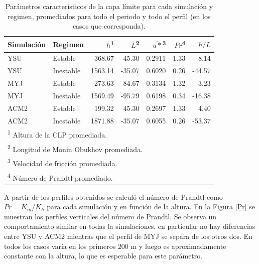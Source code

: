\documentclass[12pt,spanish,oneside, a4paper]{book}
\begin{document}
\begin{table}[!h]

\caption{\label{tab:tabla-clp}Parámetros característicos de la capa límite para cada simulación y regimen, promediados para todo el periodo y todo el perfil (en los casos que corresponda). \label{tabla-clp}}
\centering
\begin{tabular}[t]{llrrrrr}
\toprule
Simulación & Regimen & $\overline{h}$\textsuperscript{1} & $\overline{L}$\textsuperscript{2} & $\overline{u*}$\textsuperscript{3} & $\overline{Pr}$\textsuperscript{4} & $h/L$\\
\midrule
YSU & Estable & 368.67 & 45.30 & 0.2911 & 1.33 & 8.14\\
YSU & Inestable & 1563.14 & -35.07 & 0.6020 & 0.26 & -44.57\\
MYJ & Estable & 273.63 & 84.67 & 0.3134 & 1.32 & 3.23\\
MYJ & Inestable & 1569.49 & -95.79 & 0.6198 & 0.34 & -16.38\\
ACM2 & Estable & 199.32 & 45.30 & 0.2697 & 1.33 & 4.40\\
ACM2 & Inestable & 1871.88 & -35.07 & 0.6055 & 0.26 & -53.37\\
\bottomrule
\multicolumn{7}{l}{\textsuperscript{1} Altura de la CLP promediada.}\\
\multicolumn{7}{l}{\textsuperscript{2} Longitud de Monin Obukhov promediada.}\\
\multicolumn{7}{l}{\textsuperscript{3} Velocidad de fricción promediada.}\\
\multicolumn{7}{l}{\textsuperscript{4} Número de Prandtl promediado.}\\
\end{tabular}
\end{table}

A partir de los perfiles obtenidos se calculó el número de Prandtl como
\(Pr = K_m/K_h\) para cada simulación y en función de la altura. En la
Figura \ref{Pr} se muestran los perfiles verticales del número de
Prandtl. Se observa un comportamiento similar en todas la simulaciones,
en particular no hay diferencias entre YSU y ACM2 mientras que el perfil
de MYJ se separa de los otros dos. En todos los casos varía en los
primeros 200 m y luego es aproximadamente constante con la altura, lo
que es esperable para este parámetro.
\end{document}
